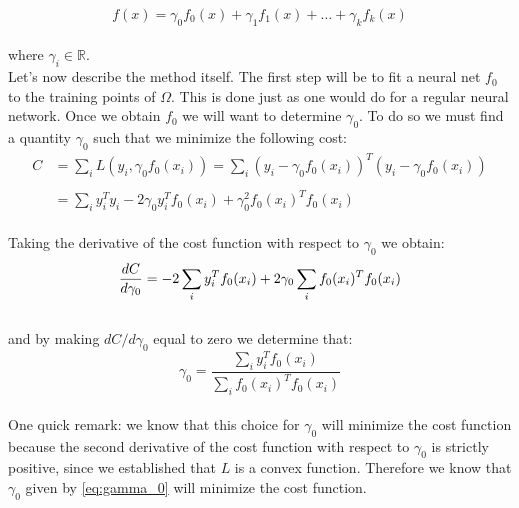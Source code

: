 \begin{equation}
f(x) = \gamma_0f_0(x)+\gamma_1f_1(x) + \dots + \gamma_kf_k(x)
\end{equation}\\

\noindent where $\gamma_i\in\mathbb{R}$.\\

Let's now describe the method itself. The first step will be to fit a neural net $f_0$ to the training points of $\Omega$. This is done just as one would do for a regular neural network. Once we obtain $f_0$ we will want to determine $\gamma_0$. To do so we must find a quantity $\gamma_0$ such that we minimize the following cost:\\

\begin{equation*}
\begin{aligned}
C &= \sum_{i}L(y_i, \gamma_0f_0(x_i))=\sum_{i}(y_i-\gamma_0f_0(x_i))^T(y_i-\gamma_0f_0(x_i))\\ \\
&=\sum_{i}y_i^Ty_i-2\gamma_0y_i^Tf_0(x_i)+\gamma_0^2f_0(x_i)^Tf_0(x_i)
\end{aligned}
\end{equation*}\\

Taking the derivative of the cost function with respect to $\gamma_0$ we obtain:\\

\begin{equation*}
\frac{dC}{d\gamma_0} = -2\sum_{i}y_i^Tf_0(x_i)+2\gamma_0\sum_{i}f_0(x_i)^Tf_0(x_i)\\
\end{equation*}\\

\noindent  and by making $dC/d\gamma_0$ equal to zero we determine that:\\

\begin{equation}\label{eq:gamma_0}
\gamma_0=\frac{\sum_{i}y_i^Tf_0(x_i)}{\sum_{i}f_0(x_i)^Tf_0(x_i)}
\end{equation}\\

One quick remark: we know that this choice for $\gamma_0$ will minimize the cost function because the second derivative of the cost function with respect to $\gamma_0$ is strictly positive, since we established that $L$ is a convex function. Therefore we know that $\gamma_0$ given by \cref{eq:gamma_0} will minimize the cost function.\\

